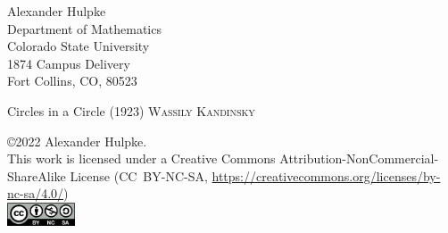 \documentclass[10pt]{memoir}
\theoremstyle{mybem}
\begin{document}
\newpage
\thispagestyle{empty}
\begin{raggedright}
{\small
Alexander Hulpke\\
Department of Mathematics\\
Colorado State University\\
1874 Campus Delivery\\
Fort Collins, CO, 80523
}
\end{raggedright}
\vfill
\setlength\epigraphwidth{4cm}
\begin{epigraphs}
{Circles in a Circle (1923)}
\textsc{Wassily Kandinsky}
\end{epigraphs}
\vspace{1cm}
\begin{raggedright}
{\small
\bigskip

\copyright 2022 Alexander Hulpke.\\
This work is licensed under a
Creative Commons Attribution-NonCommercial-ShareAlike License (CC~BY-NC-SA,
{\footnotesize \url{https://creativecommons.org/licenses/by-nc-sa/4.0/}})\\
\includegraphics[width=2cm]{pic/by-nc-sa.png}
}
\end{raggedright}
\newpage
\setlength{\cftchapternumwidth}{2em}
\setlength{\cftsectionnumwidth}{2.5em}
\setlength{\cftsubsectionindent}{4em}
\tableofcontents

\endfrontmatter
\mainmatter








\endmainmatter

\backmatter
\long{} %
%
%
\printindex
\endbackmatter
\end{document}

